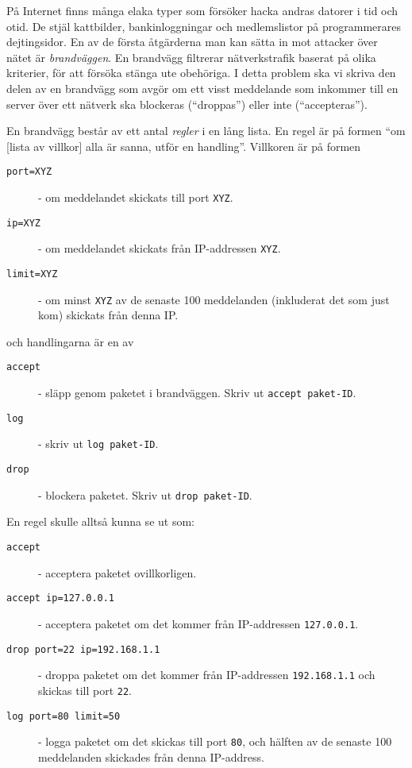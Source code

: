
På Internet finns många elaka typer som försöker hacka andras datorer i tid och otid. De stjäl kattbilder, bankinloggningar och medlemslistor på programmerares dejtingsidor.
En av de första åtgärderna man kan sätta in mot attacker över nätet är \emph{brandväggen}. En brandvägg filtrerar nätverkstrafik baserat på olika kriterier, för att försöka
stänga ute obehöriga. I detta problem ska vi skriva den delen av en brandvägg som avgör om ett visst meddelande som inkommer till en server över ett nätverk ska blockeras (``droppas'') eller inte (``accepteras''). 

En brandvägg består av ett antal \emph{regler} i en lång lista. En regel är på formen ``om [lista av villkor] alla är sanna, utför en handling''. Villkoren är på formen

\begin{description}
	\item[\texttt{port=XYZ}] - om meddelandet skickats till port \texttt{XYZ}.
	\item[\texttt{ip=XYZ}] - om meddelandet skickats från IP-addressen \texttt{XYZ}.
	\item[\texttt{limit=XYZ}] - om minst \texttt{XYZ} av de senaste 100 meddelanden (inkluderat det som just kom) skickats från denna IP.
\end{description}

och handlingarna är en av

\begin{description}
	\item[\texttt{accept}] - släpp genom paketet i brandväggen. Skriv ut \texttt{accept paket-ID}.
	\item[\texttt{log}] - skriv ut \texttt{log paket-ID}.
	\item[\texttt{drop}] - blockera paketet. Skriv ut \texttt{drop paket-ID}.
\end{description}

En regel skulle alltså kunna se ut som:
\begin{description}
	\item[\texttt{accept}] - acceptera paketet ovillkorligen.
	\item[\texttt{accept ip=127.0.0.1}] - acceptera paketet om det kommer från IP-addressen \texttt{127.0.0.1}.
	\item[\texttt{drop port=22 ip=192.168.1.1}] - droppa paketet om det kommer från IP-addressen \texttt{192.168.1.1} och skickas till port \texttt{22}.
	\item[\texttt{log port=80 limit=50}] - logga paketet om det skickas till port \texttt{80}, och hälften av de senaste 100 meddelanden skickades från denna IP-address.
\end{description}


